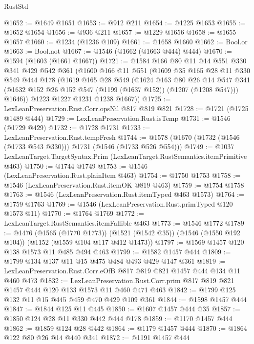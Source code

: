 \begin{lexlean}{RustStd}
\begin{coremodule}
@1652 := @1649 @1651
@1653 := @912 @211
@1654 := @1225 @1653
@1655 := @1652 @1654
@1656 := @936 @211
@1657 := @1229 @1656
@1658 := @1655 @1657
@1660 := @1234 (@1236 @109)
@1661 := @1658 @1660
@1662 := Bool.or
@1663 := Bool.not
@1667 := @1546 (@1662 (@1663 @444) @444)
@1670 := @1594 (@1603 (@1661 @1667))
@1721 := @1584
    @166
    @80
    @11
    @14
    @551
    @330
    @341
    @429
    @542
    @361
    (@1600
      @166
      @11
      @551
      (@1609
        @35
        @165
        @28
        @11
        @330
        @549
        @444
        @178
        (@1619
          @165
          @28
          @549
          (@1624
            @163
            @80
            @26
            @14
            @547
            @341
            (@1632 @152 @26 @152 @547 (@1199 (@1637 @152)) (@1207 (@1208 @547)))
            @1646))
        @1223
        @1227
        @1231
        @1238
        @1667))
@1725 := LexLeanPreservation.Rust.Corr.opsNil @817 @819 @821
@1728 := @1721 (@1725 @1489 @444)
@1729 := LexLeanPreservation.Rust.isTemp
@1731 := @1546 (@1729 @429)
@1732 := @1728 @1731
@1733 := LexLeanPreservation.Rust.tempFresh
@1744 := @1578 (@1670 (@1732 (@1546 (@1733 @543 @330))) @1731 (@1546 (@1733 @526 @554)))
@1749 := @1037 LexLeanTarget.TargetSyntax.Prim (LexLeanTarget.RustSemantics.itemPrimitive @463)
@1750 := @1744 @1749
@1753 := @1546 (LexLeanPreservation.Rust.plainItem @463)
@1754 := @1750 @1753
@1758 := @1546 (LexLeanPreservation.Rust.itemOK @819 @463)
@1759 := @1754 @1758
@1763 := @1546 (LexLeanPreservation.Rust.itemTyped @463 @1573)
@1764 := @1759 @1763
@1769 := @1546 (LexLeanPreservation.Rust.primTyped @120 @1573 @11)
@1770 := @1764 @1769
@1772 := LexLeanTarget.RustSemantics.itemFallible @463
@1773 := @1546 @1772
@1789 := @1476
    (@1565 (@1770 @1773))
    (@1521 (@1542 @35))
    (@1546 (@1550 @192 @104))
    (@1152 (@1559 @104 @117 @412 @1473))
@1797 := @1569 @1457 @120 @138 @1573 @11 @485 @494 @463
@1799 := @1582 @1457 @444
@1809 := @1799 @134 @137 @11 @15 @475 @484 @493 @429 @147 @361
@1819 := LexLeanPreservation.Rust.Corr.eOfB @817 @819 @821 @1457 @444 @134 @11 @460 @473
@1832 := LexLeanPreservation.Rust.Corr.prim
    @817
    @819
    @821
    @1457
    @444
    @120
    @133
    @1573
    @11
    @460
    @471
    @463
@1842 := @1799 @125 @132 @11 @15 @445 @459 @470 @429 @109 @361
@1844 := @1598 @1457 @444
@1847 := @1844 @125 @11 @445
@1850 := @1607 @1457 @444 @35
@1857 := @1850 @124 @28 @11 @330 @442 @444 @178
@1859 := @1170 @1457 @444
@1862 := @1859 @124 @28 @442
@1864 := @1179 @1457 @444
@1870 := @1864 @122 @80 @26 @14 @440 @341
@1872 := @1191 @1457 @444

\end{coremodule}
\end{lexlean}
